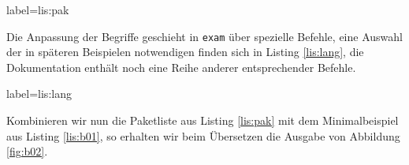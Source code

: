 \begin{lfgwcode}{label={lis:pak}}
\usepackage[ngerman]{babel} %
\usepackage[utf8]{inputenc}
\usepackage[T1]{fontenc}
\usepackage{booktabs} %
\usepackage{csquotes} %
\usepackage{paralist} %
\usepackage[math]{iwona} %
\usepackage{amsmath,textcomp,tikz} %
\usepackage{eso-pic} %
\end{lfgwcode}


Die Anpassung der Begriffe geschieht in \texttt{exam} über spezielle Befehle, eine Auswahl der in späteren Beispielen notwendigen finden sich in Listing \ref{lis:lang}, die Dokumentation enthält noch eine Reihe anderer entsprechender Befehle.

\begin{lfgwcode}{label={lis:lang}}
\renewcommand{\solutiontitle}{\noindent\textbf{Lösung:}\enspace}
 

\end{lfgwcode}

Kombinieren wir nun die Paketliste aus Listing \ref{lis:pak} mit dem Minimalbeispiel aus Listing \ref{lis:b01}, so erhalten wir beim Übersetzen die Ausgabe von Abbildung \ref{fig:b02}.

